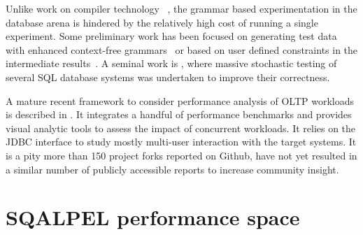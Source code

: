 \documentclass{cidr-2019}
\begin{document}
Unlike work on compiler technology
~\cite{McKeeman98differentialtesting}, the grammar based
experimentation in the database arena is hindered by the relatively
high cost of running a single experiment. Some preliminary work has
been focused on generating test data with enhanced context-free
grammars~\cite{10.1007/978-3-319-11245-9_19} or based on user defined
constraints in the intermediate
results~\cite{Binnig:2007:QGQ:1247480.1247520}. A seminal work is
\cite{DBLP:conf/vldb/Slutz98}, where massive stochastic testing of
several SQL database systems was undertaken to improve their
correctness.

A mature recent framework to consider performance analysis of OLTP
workloads is described in \cite{DBLP:journals/pvldb/DifallahPCC13}. It
integrates a handful of performance benchmarks and provides visual
analytic tools to assess the impact of concurrent workloads. It
relies on the JDBC interface to study mostly multi-user interaction
with the target systems. It is a pity more than 150 project forks
reported on Github,
have not yet resulted in a similar number of publicly accessible
reports to increase community insight.





\section{SQALPEL performance space}\label{overview}
\end{document}
